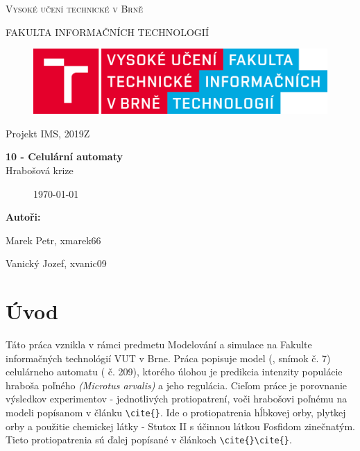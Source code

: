 \documentclass[a4paper,11pt]{article}
\begin{document}

\begin{titlepage}
\begin{center}
    {\Huge \textsc{Vysoké učení technické v Brně}}
    
    {\LARGE \uppercase{FAKULTA INFORMAČNÍCH TECHNOLOGIÍ}}
    
\begin{figure}[h]
\vspace{5.0cm}
\centering
\includegraphics[scale=0.15]{logo.png}
\vspace{-10.0cm}
\end{figure}
    
	{\LARGE Projekt IMS, 2019Z}

	{\Huge \textbf{10 - Celulární automaty}}
\\

{\LARGE {Hrabošová krize}}\\

\begin{figure}[h]
\centering
{\Large {\mydate\today}}
\vspace{6cm}
\end{figure}

\end{center}
\begin{compactitem}
\item[] \textbf{Autoři:}
\item[] Marek Petr, xmarek66
\item[] Vanický Jozef, xvanic09
\end{compactitem}

\end{titlepage}

\tableofcontents
\newpage

\section{Úvod}
Táto práca vznikla v rámci predmetu Modelování a simulace na Fakulte informačných technológií VUT v Brne. Práca popisuje model (\cite{slajdy}, snímok č. 7) celulárneho automatu (\cite{slajdy} č. 209), ktorého úlohou je predikcia intenzity populácie hraboša poľného \textit{(Microtus arvalis)} a jeho regulácia. Cieľom práce je porovnanie výsledkov experimentov - jednotlivých protiopatrení, voči hrabošovi poľnému na modeli popísanom v článku \verb|\cite{}|. Ide o protiopatrenia hĺbkovej orby, plytkej orby a použitie chemickej látky - Stutox II s účinnou látkou Fosfidom zinečnatým. Tieto protiopatrenia sú ďalej popísané v článkoch \verb|\cite{}|\verb|\cite{}|. 
\end{document}
